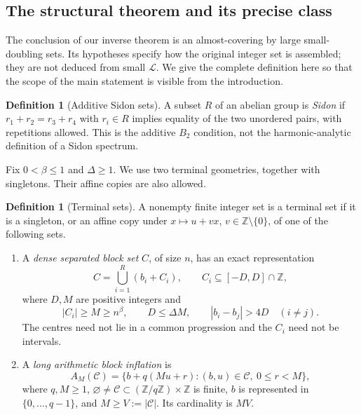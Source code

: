 \documentclass[11pt,reqno]{amsart}
\numberwithin{equation}{section}
\theoremstyle{definition}
\newtheorem{definition}[theorem]{Definition}
\theoremstyle{remark}
\newcommand{\Z}{\mathbb Z}
\newcommand{\La}{\mathcal L}
\begin{document}
\subsection{The structural theorem and its precise class}

The conclusion of our inverse theorem is an almost-covering by large
small-doubling sets. Its hypotheses specify how the original integer set
is assembled; they are not deduced from small $\La$. We give the complete
definition here so that the scope of the main statement is visible from
the introduction.

\begin{definition}[Additive Sidon sets]\label{def:sidon}
A subset $R$ of an abelian group is \emph{Sidon} if
$r_1+r_2=r_3+r_4$ with $r_i\in R$ implies equality of the two unordered
pairs, with repetitions allowed. This is the additive $B_2$ condition,
not the harmonic-analytic definition of a Sidon spectrum.
\end{definition}

Fix $0<\beta\le1$ and $\Delta\ge1$. We use two terminal geometries,
together with singletons. Their affine copies are also allowed.

\begin{definition}[Terminal sets]\label{def:terminals}
A nonempty finite integer set is a terminal set if it is a singleton,
or an affine copy under $x\mapsto u+vx$, $v\in\Z\setminus\{0\}$, of one
of the following sets.
\begin{enumerate}
\item A \emph{dense separated block set} $C$, of size $n$, has an exact
representation
\begin{equation}\label{eq:terminal-packet}
 C=\bigcup_{i=1}^R(b_i+C_i),\qquad C_i\subseteq[-D,D]\cap\Z,
\end{equation}
where $D,M$ are positive integers and
\begin{equation}\label{eq:terminal-packet-conditions}
 |C_i|\ge M\ge n^\beta,\qquad D\le\Delta M,
 \qquad |b_i-b_j|>4D\quad(i\ne j).
\end{equation}
The centres need not lie in a common progression and the $C_i$ need not
be intervals.
\item A \emph{long arithmetic block inflation} is
\begin{equation}\label{eq:terminal-inflation}
 A_M(\mathcal C)=
 \{b+q(Mu+r):(b,u)\in\mathcal C,\ 0\le r<M\},
\end{equation}
where $q,M\ge1$, $\varnothing\ne\mathcal C\subset(\Z/q\Z)\times\Z$ is
finite, $b$ is represented in $\{0,\ldots,q-1\}$, and
$M\ge V:=|\mathcal C|$. Its cardinality is $MV$.
\end{enumerate}
\end{definition}
\end{document}
